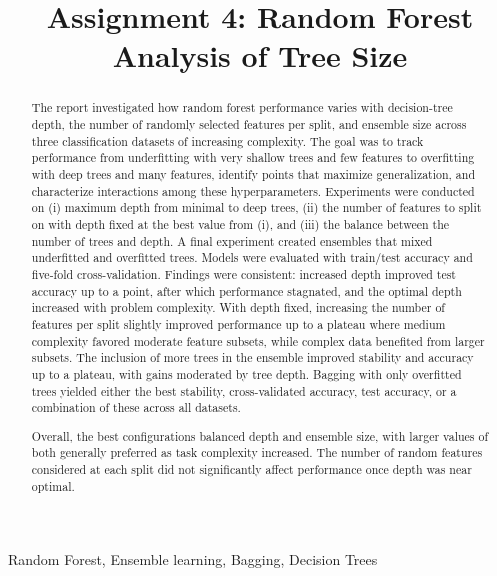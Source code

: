 \documentclass[conference]{IEEEtran}
\begin{document}
\title{Assignment 4: Random Forest Analysis of Tree Size}

\author{
}

\maketitle


\begin{abstract}
The report investigated how random forest performance varies with decision-tree depth, the number of randomly selected features per split, and ensemble size across three classification datasets of increasing complexity. The goal was to track performance from underfitting with very shallow trees and few features to overfitting with deep trees and many features, identify points that maximize generalization, and characterize interactions among these hyperparameters. Experiments were conducted on (i) maximum depth from minimal to deep trees, (ii) the number of features to split on with depth fixed at the best value from (i), and (iii) the balance between the number of trees and depth. A final experiment created ensembles that mixed underfitted and overfitted trees. Models were evaluated with train/test accuracy and five-fold cross-validation. Findings were consistent: increased depth improved test accuracy up to a point, after which performance stagnated, and the optimal depth increased with problem complexity. With depth fixed, increasing the number of features per split slightly improved performance up to a plateau where medium complexity favored moderate feature subsets, while complex data benefited from larger subsets. The inclusion of more trees in the ensemble improved stability and accuracy up to a plateau, with gains moderated by tree depth. Bagging with only overfitted trees yielded either the best stability, cross-validated accuracy, test accuracy, or a combination of these across all datasets.

 Overall, the best configurations balanced depth and ensemble size, with larger values of both generally preferred as task complexity increased. The number of random features considered at each split did not significantly affect performance once depth was near optimal.
\end{abstract}


\begin{IEEEkeywords}
Random Forest, Ensemble learning, Bagging, Decision Trees
\end{IEEEkeywords}
\end{document}
